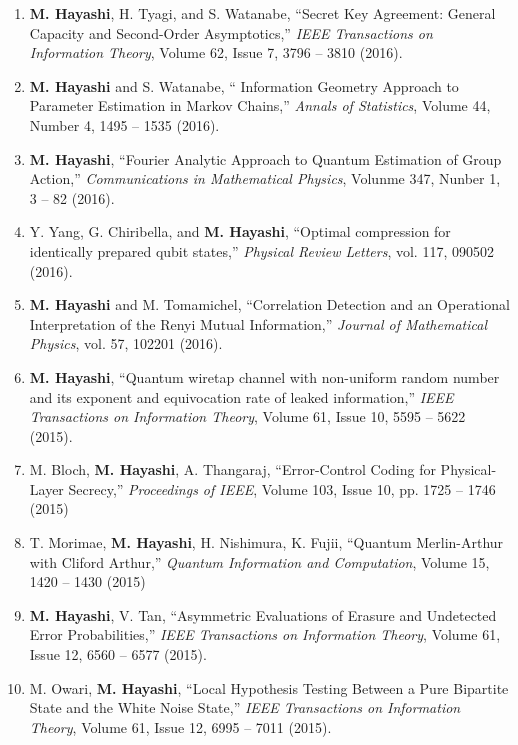 \documentclass[a4paper,12pt,oneside]{article}
\begin{document}
\begin{enumerate}
\item 
\textbf{M. Hayashi}, H. Tyagi, and S. Watanabe, ``Secret Key Agreement: General Capacity and Second-Order Asymptotics,'' 
{\em IEEE Transactions on Information Theory}, Volume 62, Issue 7, 3796 -- 3810 (2016). 

\item 
\textbf{M. Hayashi} and S. Watanabe, `` Information Geometry Approach to Parameter Estimation in Markov Chains,'' 
{\em Annals of Statistics}, Volume 44, Number 4, 1495 -- 1535 (2016). 

\item 
\textbf{M. Hayashi}, 
``Fourier Analytic Approach to Quantum Estimation of Group Action,'' 
{\em Communications in Mathematical Physics}, Volunme 347, Nunber 1, 3 -- 82 (2016). 

\item 
Y. Yang, G. Chiribella, and \textbf{M. Hayashi}, 
``Optimal compression for identically prepared qubit states,'' 
{\em Physical Review Letters}, vol. 117, 090502 (2016).

\item 
\textbf{M. Hayashi} and M. Tomamichel, 
``Correlation Detection and an Operational Interpretation of the Renyi Mutual Information,'' 
{\em Journal of Mathematical Physics}, vol. 57, 102201 (2016).

\item 
\textbf{M. Hayashi}, ``Quantum wiretap channel with non-uniform random number and its exponent and equivocation rate of leaked information,'' 
{\em IEEE Transactions on Information Theory}, Volume 61, Issue 10, 5595 -- 5622 (2015). 

\item 
M. Bloch, \textbf{M. Hayashi}, A. Thangaraj, ``Error-Control Coding for Physical-Layer Secrecy,'' 
{\em Proceedings of IEEE}, Volume 103, Issue 10, pp. 1725 -- 1746 (2015) 

\item 
T. Morimae, \textbf{M. Hayashi}, H. Nishimura, K. Fujii, ``Quantum Merlin-Arthur with Cliford Arthur,'' 
{\em Quantum Information and Computation}, 
Volume 15, 1420 -- 1430 (2015)

\item 
\textbf{M. Hayashi}, V. Tan, ``Asymmetric Evaluations of Erasure and Undetected Error Probabilities,'' 
{\em IEEE Transactions on Information Theory}, Volume 61, Issue 12, 6560 -- 6577 (2015). 

\item 
M. Owari, \textbf{M. Hayashi}, ``Local Hypothesis Testing Between a Pure Bipartite State and the White Noise State,'' 
{\em IEEE Transactions on Information Theory}, 
Volume 61, Issue 12, 6995 -- 7011 (2015).


\end{enumerate}
\end{document}

